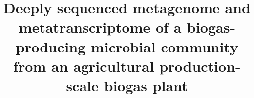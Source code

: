 \documentclass{bmcart}
\begin{document}
\begin{frontmatter}

\begin{fmbox}


\title{Deeply sequenced metagenome and metatranscriptome of a biogas-producing microbial community from an agricultural production-scale biogas plant}


\author[
   addressref={cebitec,techfak},
   corref={cebitec},
   email={abremges@cebitec.uni-bielefeld.de}
]{ }
\author[
   addressref={cebitec},
   email={irena.maus@cebitec.uni-bielefeld.de}
]{ }
\author[
   addressref={cebitec,techfak},
   email={pbelmann@cebitec.uni-bielefeld.de}
]{ }
\author[
   addressref={cebitec},
   email={feikmeye@cebitec.uni-bielefeld.de}
]{ }
\author[
   addressref={cebitec},
   email={awinkler@cebitec.uni-bielefeld.de}
]{ }
\author[
   addressref={cebitec},
   email={aalbersm@cebitec.uni-bielefeld.de}
]{ }
\author[
   addressref={cebitec},
   email={puehler@cebitec.uni-bielefeld.de}
]{ }
\author[
   addressref={cebitec},
   noteref={n1},
   email={aschluet@cebitec.uni-bielefeld.de}
]{ }
\author[
   addressref={cebitec,techfak},
   noteref={n1},
   email={asczyrba@cebitec.uni-bielefeld.de}
]{ }



\end{fmbox}
\end{frontmatter}
\end{document}
